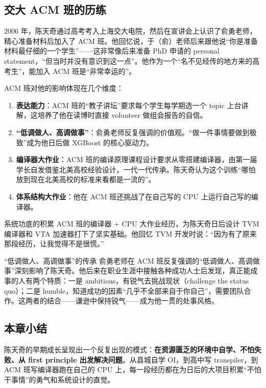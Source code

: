 \subsection{交大 ACM 班的历练}

2006 年，陈天奇通过高考考入上海交大电院，然后在宣讲会上认识了俞勇老师，精心准备材料后加入了 ACM 班。他回忆说，于（俞）老师后来跟他说``你是准备材料最仔细的一个学生''------这非常像后来准备 PhD 申请的 personal statement，``但当时并没有意识到这一点''。他作为一个``名不见经传的地方来的高考生''，能加入 ACM 班是``非常幸运的''。

ACM 班对他的影响体现在几个维度：

\begin{enumerate}
    \item \textbf{表达能力}：ACM 班的``教子讲坛''要求每个学生每学期选一个 topic 上台讲解，这培养了他在读博时直接 volunteer 做组会报告的自信。
    \item \textbf{``低调做人、高调做事''}：俞勇老师反复强调的价值观。``做一件事情要做到极致''成为他日后做 XGBoost 的核心驱动力。
    \item \textbf{编译器大作业}：ACM 班的编译原理课程设计要求从零搭建编译器，由第一届学长自发借鉴北美高校经验设计，一代一代传承。陈天奇认为这个训练``哪怕放到现在北美高校的标准来看都是一流的''。
    \item \textbf{体系结构大作业}：他在 ACM 班还挑战了在自己写的 CPU 上运行自己写的编译器。
\end{enumerate}

\begin{importantbox}{系统功底的积累}
ACM 班的编译器 + CPU 大作业经历，为陈天奇日后设计 TVM 编译器和 VTA 加速器打下了坚实基础。他回忆 TVM 开发时说：``因为有了原来那段经历，让我觉得不是很慌。''
\end{importantbox}

\begin{importantbox}{``低调做人、高调做事''的传承}
俞勇老师在 ACM 班反复强调的``低调做人、高调做事''深刻影响了陈天奇。他后来在职业生涯中接触各种成功人士后发现，真正能成事的人有两个特质：一是 ambitious，有锐气去挑战现状（challenge the status quo）；二是 humble，知道成功的因素``几乎不全部来自于你自己''，需要团队合作。这两者的结合------谦逊中保持锐气------成为他一贯的处事风格。
\end{importantbox}

\subsection{本章小结}

陈天奇的早期成长呈现出一个反复出现的模式：\textbf{在资源匮乏的环境中自学、不怕失败、从 first principle 出发解决问题}。从县城自学 OI，到高中写 transpiler，到 ACM 班写编译器跑在自己的 CPU 上，每一段经历都在为日后的大项目积累``不怕干事情''的勇气和系统设计的直觉。

